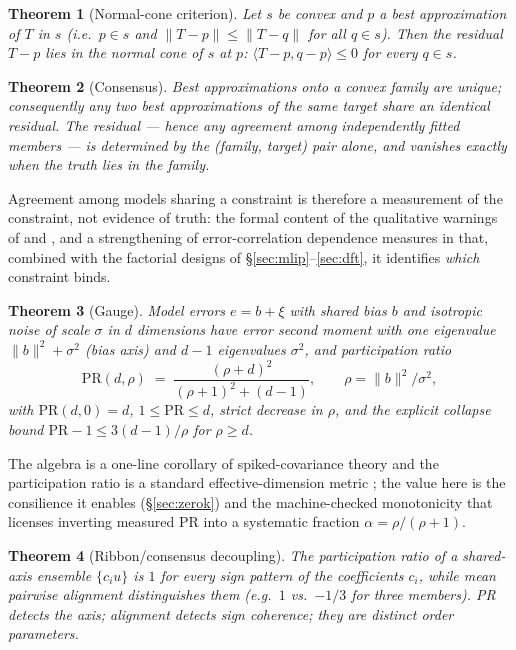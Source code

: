 \documentclass[11pt]{article}
\newtheorem{theorem}{Theorem}
\newcommand{\inn}[2]{\langle #1, #2 \rangle}
\begin{document}
\begin{theorem}[Normal-cone criterion]\label{thm:cone}
Let $s$ be convex and $p$ a best approximation of $T$ in $s$
(i.e.\ $p \in s$ and $\|T-p\| \le \|T-q\|$ for all $q \in s$). Then the
residual $T - p$ lies in the normal cone of $s$ at $p$:
$\inn{T-p}{q-p} \le 0$ for every $q \in s$.
\end{theorem}

\begin{theorem}[Consensus]\label{thm:consensus}
Best approximations onto a convex family are unique; consequently any two best
approximations of the same target share an \emph{identical} residual. The
residual --- hence any agreement among independently fitted members --- is
determined by the (family, target) pair alone, and vanishes exactly when the
truth lies in the family.
\end{theorem}

Agreement among models sharing a constraint is therefore a measurement of the
constraint, not evidence of truth: the formal content of the qualitative
warnings of \citet{parker2011} and \citet{pirtle2010}, and a strengthening of
error-correlation dependence measures \citep{bishop2013} in that, combined
with the factorial designs of \S\ref{sec:mlip}--\ref{sec:dft}, it identifies
\emph{which} constraint binds.

\begin{theorem}[Gauge]\label{thm:gauge}
Model errors $e = b + \xi$ with shared bias $b$ and isotropic noise of scale
$\sigma$ in $d$ dimensions have error second moment with one eigenvalue
$\|b\|^2 + \sigma^2$ (bias axis) and $d{-}1$ eigenvalues $\sigma^2$, and
participation ratio
\[
\mathrm{PR}(d,\rho) \;=\; \frac{(\rho+d)^2}{(\rho+1)^2 + (d-1)},
\qquad \rho = \|b\|^2/\sigma^2 ,
\]
with $\mathrm{PR}(d,0)=d$, $1 \le \mathrm{PR} \le d$, strict decrease in
$\rho$, and the explicit collapse bound
$\mathrm{PR}-1 \le 3(d-1)/\rho$ for $\rho \ge d$.
\end{theorem}

The algebra is a one-line corollary of spiked-covariance theory
\citep{johnstone2001} and the participation ratio is a standard
effective-dimension metric \citep{gao2015}; the value here is the consilience
it enables (\S\ref{sec:zerok}) and the machine-checked monotonicity that
licenses inverting measured PR into a systematic fraction
$\alpha = \rho/(\rho+1)$.

\begin{theorem}[Ribbon/consensus decoupling]\label{thm:decouple}
The participation ratio of a shared-axis ensemble $\{c_i u\}$ is $1$ for every
sign pattern of the coefficients $c_i$, while mean pairwise alignment
distinguishes them (e.g.\ $1$ vs.\ $-1/3$ for three members). PR detects the
\emph{axis}; alignment detects \emph{sign coherence}; they are distinct order
parameters.
\end{theorem}
\end{document}
